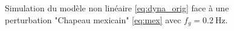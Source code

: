 \begin{figure}[ht!]
    \centering
    \caption{Simulation du modèle non linéaire \eqref{eq:dyna_orig} face à une perturbation "Chapeau mexicain" \eqref{eq:mex} avec $f_g = \SI{0.2}{\Hz}$.}
    \label{fig:sim_mex0_2}
\end{figure}


